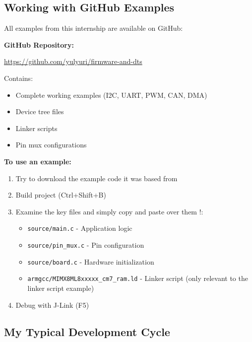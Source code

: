 \documentclass[12pt,a4paper]{report}
\begin{document}
\subsection{Working with GitHub Examples}

All examples from this internship are available on GitHub:

\begin{gitref}
\textbf{GitHub Repository:}

\url{https://github.com/yulyuri/firmware-and-dts}

Contains:
\begin{itemize}
    \item Complete working examples (I2C, UART, PWM, CAN, DMA)
    \item Device tree files
    \item Linker scripts
    \item Pin mux configurations
\end{itemize}

\textbf{To use an example:}
\begin{enumerate}
    \item Try to download the example code it was based from
    \item Build project (Ctrl+Shift+B)
    \item Examine the key files and simply copy and paste over them !:
    \begin{itemize}
        \item \texttt{source/main.c} - Application logic
        \item \texttt{source/pin\_mux.c} - Pin configuration
        \item \texttt{source/board.c} - Hardware initialization
        \item \texttt{armgcc/MIMX8ML8xxxxx\_cm7\_ram.ld} - Linker script (only relevant to the linker script example)
    \end{itemize}
    \item Debug with J-Link (F5)
\end{enumerate}
\end{gitref}

\subsection{My Typical Development Cycle}
\end{document}
